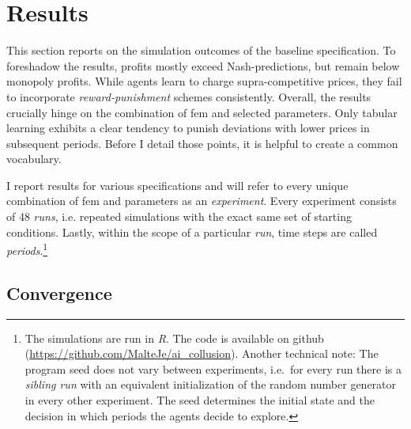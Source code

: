 \section{Results}\label{results}
This section reports on the simulation outcomes of the baseline specification. To foreshadow the results, profits mostly exceed Nash-predictions, but remain below monopoly profits. While agents learn to charge supra-competitive prices, they fail to incorporate \emph{reward-punishment} schemes consistently. Overall, the results crucially hinge on the combination of \gls{fem} and selected parameters. Only tabular learning exhibits a clear tendency to punish deviations with lower prices in subsequent periods. Before I detail those points, it is helpful to create a common vocabulary.

I report results for various specifications and will refer to every unique combination of \gls{fem} and parameters as an \emph{experiment}. Every experiment consists of 48 \emph{runs}, i.e. repeated simulations with the exact same set of starting conditions. Lastly, within the scope of a particular \emph{run}, time steps are called \emph{periods}.\footnote{The simulations are run in \emph{R}. The code is available on github (\url{https://github.com/MalteJe/ai_collusion}). Another technical note: The program seed does not vary between experiments, i.e.\ for every run there is a \emph{sibling run} with an equivalent initialization of the random number generator in every other experiment. The seed determines the initial state and the decision in which periods the agents decide to explore.}

\subsection{Convergence}\label{convergence}

